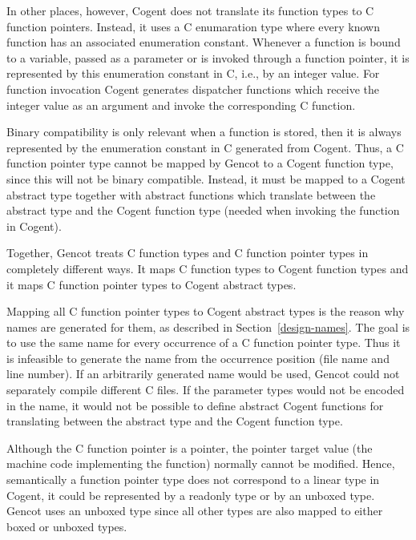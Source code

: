 In other places, however, Cogent does not translate its function types to C function pointers. Instead, it uses 
a C enumaration type where 
every known function has an associated enumeration constant. Whenever a function is bound to a variable, passed 
as a parameter or is invoked through a function pointer, it is represented by this enumeration constant in C, i.e., by an integer value.
For function invocation Cogent generates dispatcher functions which receive the integer value as an argument
and invoke the corresponding C function. 

Binary compatibility is only relevant when a function is stored, then it is always represented by the enumeration
constant in C generated from Cogent. Thus, a C function pointer type cannot be 
mapped by Gencot to a Cogent function type,
since this will not be binary compatible. Instead, it must be mapped to a Cogent abstract type together with 
abstract functions which translate between the abstract type and the Cogent function type (needed when invoking 
the function in Cogent).

Together, Gencot treats C function types and C function pointer types in completely different ways. It maps
C function types to Cogent function types and it maps C function pointer types to Cogent abstract types.

Mapping all C function pointer types to Cogent abstract types is the reason why names are generated for them, as
described in Section~\ref{design-names}. The goal is to use the same name for every occurrence of a C 
function pointer type. Thus it is infeasible to generate the name from 
the occurrence position (file name and line number). If an arbitrarily generated name would be used, 
Gencot could not separately compile different C files. If the parameter types would not be encoded in
the name, it would not be possible to define abstract Cogent functions for translating between the
abstract type and the Cogent function type.

Although the C function pointer is a pointer, the pointer target value (the machine code implementing the function) 
normally cannot be modified. Hence, semantically a function pointer type does not correspond to a linear type
in Cogent, it could be represented by a readonly type or by an unboxed type. Gencot uses an unboxed type
since all other types are also mapped to either boxed or unboxed types. 

